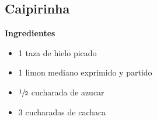 \subsection{Caipirinha}

\textbf{Ingredientes}
\begin{itemize}
\item 1 taza de hielo picado
\item 1 limon mediano exprimido y partido
\item $\sfrac{1}{2}$ cucharada de azucar
\item 3 cucharadas de cachaca
\end{itemize}
